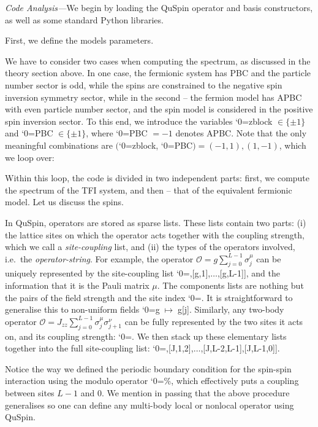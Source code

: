 \documentclass{SciPost}
\newcommand\0{\scalebox{-1}[1]{0}}
\let\svttfamily\ttfamily
\renewcommand\ttfamily{\svttfamily\catcode`0=\active }
\renewcommand\texttt{\bgroup\ttfamily\texttthelp}
\def\texttthelp#1{#1\egroup}
\newcommand{\JWcode}{example4.py}
\begin{document}
\noindent\emph{Code Analysis---}We begin by loading the QuSpin operator and basis constructors, as well as some standard Python libraries. 

First, we define the models parameters.

We have to consider two cases when computing the spectrum, as discussed in the theory section above. In one case, the fermionic system has PBC and the particle number sector is odd, while the spins are constrained to the negative spin inversion symmetry sector, while in the second -- the fermion model has APBC with even particle number sector, and the spin model is considered in the positive spin inversion sector. To this end, we introduce the variables \texttt{zblock} $\in\{\pm 1\}$ and \texttt{PBC} $\in\{\pm 1\}$, where \texttt{PBC} $=-1$ denotes APBC. Note that the only meaningful combinations are $($\texttt{zblock}, \texttt{PBC}$)=(-1,1),(1,-1)$, which we loop over:

Within this loop, the code is divided in two independent parts: first, we compute the spectrum of the TFI system, and then -- that of the equivalent fermionic model. Let us discuss the spins. 

In QuSpin, operators are stored as sparse lists. These lists contain two parts: (i) the lattice sites on which the operator acts together with the coupling strength, which we call a \emph{site-coupling} list, and (ii) the types of the operators involved, i.e.~the \emph{operator-string}. For example, the operator $\mathcal{O}=g\sum_{j=0}^{L-1}\sigma^\mu_j$ can be uniquely represented by the site-coupling list \texttt{[[g,0],[g,1],$\dots$,[g,L-1]]}, and the information that it is the Pauli matrix $\mu$. The components lists are nothing but the pairs of the field strength and the site index \texttt{[g,j]}. It is straightforward to generalise this to non-uniform fields \texttt{g$\;\mapsto\;$g[j]}. Similarly, any two-body operator $\mathcal{O}=J_{zz}\sum_{j=0}^{L-1}\sigma^\mu_j\sigma^\nu_{j+1}$ can be fully represented by the two sites it acts on, and its coupling strength: \texttt{[J,j,j+1]}. We then stack up these elementary lists together into the full site-coupling list: \texttt{[[J,0,1],[J,1,2],$\dots$,[J,L-2,L-1],[J,L-1,0]]}. 

Notice the way we defined the periodic boundary condition for the spin-spin interaction using the modulo operator \texttt{\%}, which effectively puts a coupling between sites $L-1$ and $0$. We mention in passing that the above procedure generalises so one can define any multi-body local or nonlocal operator using QuSpin. 
\end{document}
